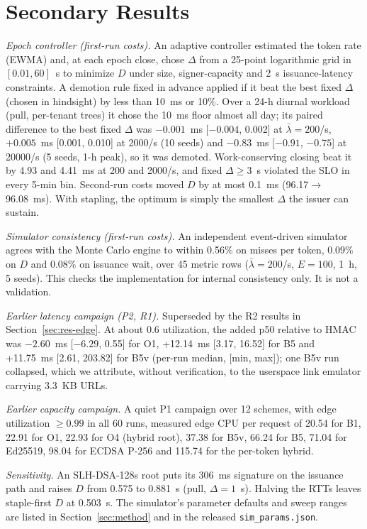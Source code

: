 \section{Secondary Results}
\label{app:secondary}

\emph{Epoch controller (first-run costs).} An adaptive controller estimated the token rate (EWMA) and, at each epoch close, chose $\Delta$ from a 25-point logarithmic grid in $[0.01,60]$~s to minimize $D$ under size, signer-capacity and 2~s issuance-latency constraints. A demotion rule fixed in advance applied if it beat the best fixed $\Delta$ (chosen in hindsight) by less than 10~ms or 10\%. Over a 24-h diurnal workload (pull, per-tenant trees) it chose the 10~ms floor almost all day; its paired difference to the best fixed $\Delta$ was $-0.001$~ms [$-0.004$, 0.002] at $\bar\lambda=200$/s, $+0.005$~ms [0.001, 0.010] at 2000/s (10 seeds) and $-0.83$~ms [$-0.91$, $-0.75$] at \num{20000}/s (5 seeds, 1-h peak), so it was demoted. Work-conserving closing beat it by 4.93 and 4.41~ms at 200 and 2000/s, and fixed $\Delta\ge3$~s violated the SLO in every 5-min bin. Second-run costs moved $D$ by at most 0.1~ms (96.17$\to$96.08~ms). With stapling, the optimum is simply the smallest $\Delta$ the issuer can sustain.

\emph{Simulator consistency (first-run costs).} An independent event-driven simulator agrees with the Monte Carlo engine to within 0.56\% on misses per token, 0.09\% on $D$ and 0.08\% on issuance wait, over 45 metric rows ($\bar\lambda=200$/s, $E=100$, 1~h, 5 seeds). This checks the implementation for internal consistency only. It is not a validation.

\emph{Earlier latency campaign (P2, R1).} Superseded by the R2 results in Section~\ref{sec:res-edge}. At about 0.6 utilization, the added p50 relative to HMAC was $-2.60$~ms [$-6.29$, 0.55] for O1, +12.14~ms [3.17, 16.52] for B5 and +11.75~ms [2.61, 203.82] for B5v (per-run median, [min, max]); one B5v run collapsed, which we attribute, without verification, to the userspace link emulator carrying 3.3~KB URLs.

\emph{Earlier capacity campaign.} A quiet P1 campaign over 12 schemes, with edge utilization $\ge0.99$ in all 60 runs, measured edge CPU per request of 20.54\us{} for B1, 22.91 for O1, 22.93 for O4 (hybrid root), 37.38 for B5v, 66.24 for B5, 71.04 for Ed25519, 98.04 for ECDSA P-256 and 115.74 for the per-token hybrid.

\emph{Sensitivity.} An SLH-DSA-128s root puts its 306~ms signature on the issuance path and raises $D$ from 0.575 to 0.881~s (pull, $\Delta=1$~s). Halving the RTTs leaves staple-first $D$ at 0.503~s. The simulator's parameter defaults and sweep ranges are listed in Section~\ref{sec:method} and in the released \texttt{sim\_params.json}.

